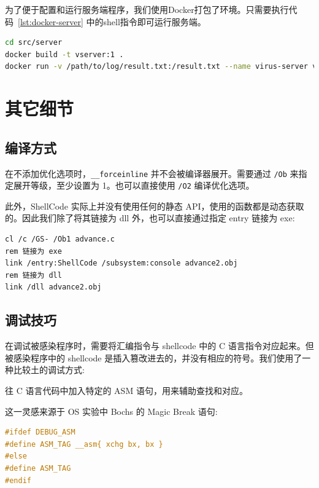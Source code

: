 \documentclass[UTF8]{ctexart}
\begin{document}
    为了便于配置和运行服务端程序，我们使用Docker打包了环境。只需要执行代码~\ref{lst:docker-server} 中的shell指令即可运行服务端。
    
    \begin{lstlisting}[language=bash,caption={使用Docker运行服务端},captionpos=b,label={lst:docker-server}]
cd src/server
docker build -t vserver:1 .
docker run -v /path/to/log/result.txt:/result.txt --name virus-server vserver
    \end{lstlisting}

    \section{其它细节}
    \subsection{编译方式}

    在不添加优化选项时，\lstinline{__forceinline} 并不会被编译器展开。需要通过 \verb|/Ob| 来指定展开等级，至少设置为 1。也可以直接使用 \verb|/O2| 编译优化选项。

    此外，ShellCode 实际上并没有使用任何的静态 API，使用的函数都是动态获取的。因此我们除了将其链接为 dll 外，也可以直接通过指定 entry 链接为 exe:

    \begin{lstlisting}[caption={链接方式},captionpos=b]
cl /c /GS- /Ob1 advance.c
rem 链接为 exe
link /entry:ShellCode /subsystem:console advance2.obj
rem 链接为 dll
link /dll advance2.obj
    \end{lstlisting}
    
    \subsection{调试技巧}

    在调试被感染程序时，需要将汇编指令与 shellcode 中的 C 语言指令对应起来。但被感染程序中的 shellcode 是插入篡改进去的，并没有相应的符号。我们使用了一种比较土的调试方式:

    往 C 语言代码中加入特定的 ASM 语句，用来辅助查找和对应。

    这一灵感来源于 OS 实验中 Bochs 的 Magic Break 语句:

    \begin{lstlisting}[language=C,caption={ASM TAG},captionpos=b]
#ifdef DEBUG_ASM
#define ASM_TAG __asm{ xchg bx, bx }
#else
#define ASM_TAG
#endif
    \end{lstlisting}
\end{document}
